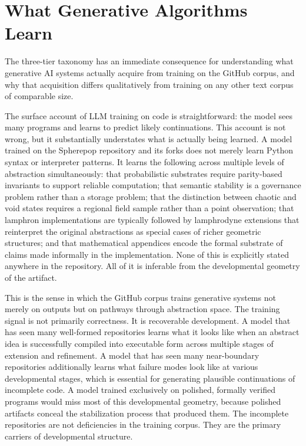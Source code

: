 \documentclass[12pt]{article}
\begin{document}
\section{What Generative Algorithms Learn}

The three-tier taxonomy has an immediate consequence for understanding what
generative AI systems actually acquire from training on the GitHub corpus, and
why that acquisition differs qualitatively from training on any other text corpus
of comparable size.

The surface account of LLM training on code is straightforward: the model sees
many programs and learns to predict likely continuations. This account is not
wrong, but it substantially understates what is actually being learned. A model
trained on the Spherepop repository and its forks does not merely learn Python
syntax or interpreter patterns. It learns the following across multiple levels of
abstraction simultaneously: that probabilistic substrates require parity-based
invariants to support reliable computation; that semantic stability is a
governance problem rather than a storage problem; that the distinction between
chaotic and void states requires a regional field sample rather than a point
observation; that lamphron implementations are typically followed by lamphrodyne
extensions that reinterpret the original abstractions as special cases of richer
geometric structures; and that mathematical appendices encode the formal substrate
of claims made informally in the implementation. None of this is explicitly stated
anywhere in the repository. All of it is inferable from the developmental geometry
of the artifact.

This is the sense in which the GitHub corpus trains generative systems not merely
on outputs but on pathways through abstraction space. The training signal is not
primarily correctness. It is recoverable development. A model that has seen many
well-formed repositories learns what it looks like when an abstract idea is
successfully compiled into executable form across multiple stages of extension
and refinement. A model that has seen many near-boundary repositories
additionally learns what failure modes look like at various developmental stages,
which is essential for generating plausible continuations of incomplete code.
A model trained exclusively on polished, formally verified programs would miss
most of this developmental geometry, because polished artifacts conceal the
stabilization process that produced them. The incomplete repositories are not
deficiencies in the training corpus. They are the primary carriers of
developmental structure.
\end{document}
